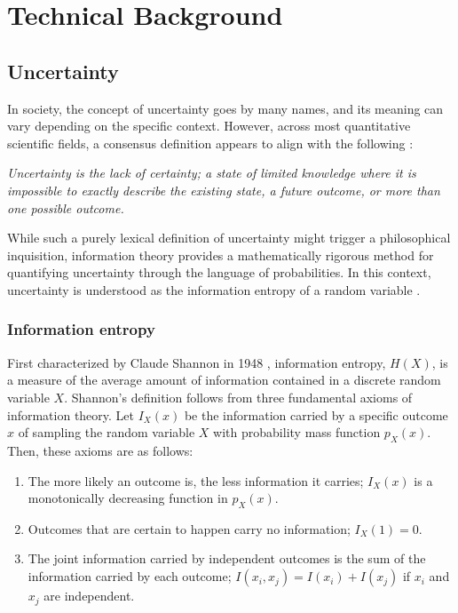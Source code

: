 

\chapter[technical background]{Technical Background}\label{chp:technical-background}

\section{Uncertainty}


In society, the concept of uncertainty goes by many names, and its meaning can vary depending on the specific context. However, across most quantitative scientific fields, a consensus definition appears to align with the following \cite{hubbard_how_2014}:

\begin{center}
    \textit{Uncertainty is the lack of certainty; a state of limited knowledge where it is impossible to exactly describe the existing state, a future outcome, or more than one possible outcome.}
\end{center}

While such a purely lexical definition of uncertainty might trigger a philosophical inquisition, information theory provides a mathematically rigorous method for quantifying uncertainty through the language of probabilities. 
In this context, uncertainty is understood as the information entropy of a random variable \cite{mackay_information_2003}. 


\subsection{Information entropy}
First characterized by Claude Shannon in 1948 \cite{shannon_mathematical_1948}, information entropy, $H(X)$, is a measure of the average amount of information contained in a discrete random variable $X$. Shannon's definition follows from three fundamental axioms of information theory. Let $I_X(x)$ be the information carried by a specific outcome $x$ of sampling the random variable $X$ with probability mass function $p_X(x)$. Then, these axioms are as follows:
\begin{enumerate}[label=(\Roman*)]
    \item The more likely an outcome is, the less information it carries; $I_X(x)$ is a monotonically decreasing function in $p_X(x)$.
    \item Outcomes that are certain to happen carry no information; $I_X(1) = 0$.
    \item The joint information carried by independent outcomes is the sum of the information carried by each outcome; $I(x_i, x_j) = I(x_i) + I(x_j)$ if $x_i$ and $x_j$ are independent. 
\end{enumerate}

